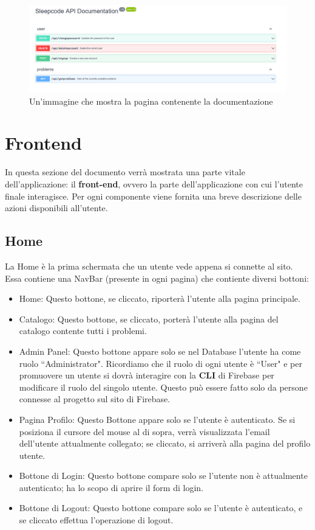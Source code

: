 \documentclass[11pt, a4paper]{article}
\theoremstyle{definition}
\begin{document}
\begin{figure}[H]
  \centering
  \includegraphics[width=\textwidth]{materiale/API/API-doc.png}
  \caption{Un'immagine che mostra la pagina contenente la documentazione}
  \label{documentazione}
\end{figure}

\newpage
\section{Frontend}
In questa sezione del documento verrà mostrata una parte vitale dell'applicazione: il \textbf{front-end}, ovvero la parte dell'applicazione con cui l'utente finale interagisce.
Per ogni componente viene fornita una breve descrizione delle azioni disponibili all'utente.

\subsection{Home}
La Home è la prima schermata che un utente vede appena si connette al sito. Essa contiene una NavBar (presente in ogni pagina) che contiente diversi bottoni:
\begin{itemize}
  \item Home: Questo bottone, se cliccato, riporterà l'utente alla pagina principale.
  \item Catalogo: Questo bottone, se cliccato, porterà l'utente alla pagina del catalogo contente tutti i problemi.
  \item Admin Panel: Questo bottone appare solo se nel Database l'utente ha come ruolo ``Administrator". Ricordiamo che il ruolo di ogni utente è ``User" e per promuovere un utente
  si dovrà interagire con la \textbf{CLI} di Firebase per modificare il ruolo del singolo utente. Questo può essere fatto solo da persone connesse al progetto sul sito di Firebase.
  \item Pagina Profilo: Questo Bottone appare solo se l'utente è autenticato. Se si posiziona il cursore del mouse al di sopra, verrà visualizzata l'email dell'utente attualmente collegato; se cliccato, si arriverà alla pagina del profilo utente.
  \item Bottone di Login: Questo bottone compare solo se l'utente non è attualmente autenticato; ha lo scopo di aprire il form di login.
  \item Bottone di Logout: Questo bottone compare solo se l'utente è autenticato, e se cliccato effettua l'operazione di logout.
\end{itemize}
\end{document}
